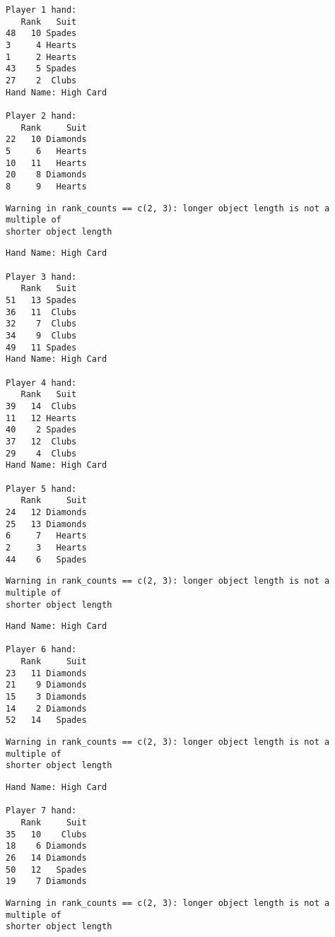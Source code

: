 \documentclass[
  letterpaper,
  DIV=11,
  numbers=noendperiod]{scrartcl}
\begin{document}
\begin{verbatim}
Player 1 hand: 
   Rank   Suit
48   10 Spades
3     4 Hearts
1     2 Hearts
43    5 Spades
27    2  Clubs
Hand Name: High Card 

Player 2 hand: 
   Rank     Suit
22   10 Diamonds
5     6   Hearts
10   11   Hearts
20    8 Diamonds
8     9   Hearts
\end{verbatim}

\begin{verbatim}
Warning in rank_counts == c(2, 3): longer object length is not a multiple of
shorter object length
\end{verbatim}

\begin{verbatim}
Hand Name: High Card 

Player 3 hand: 
   Rank   Suit
51   13 Spades
36   11  Clubs
32    7  Clubs
34    9  Clubs
49   11 Spades
Hand Name: High Card 

Player 4 hand: 
   Rank   Suit
39   14  Clubs
11   12 Hearts
40    2 Spades
37   12  Clubs
29    4  Clubs
Hand Name: High Card 

Player 5 hand: 
   Rank     Suit
24   12 Diamonds
25   13 Diamonds
6     7   Hearts
2     3   Hearts
44    6   Spades
\end{verbatim}

\begin{verbatim}
Warning in rank_counts == c(2, 3): longer object length is not a multiple of
shorter object length
\end{verbatim}

\begin{verbatim}
Hand Name: High Card 

Player 6 hand: 
   Rank     Suit
23   11 Diamonds
21    9 Diamonds
15    3 Diamonds
14    2 Diamonds
52   14   Spades
\end{verbatim}

\begin{verbatim}
Warning in rank_counts == c(2, 3): longer object length is not a multiple of
shorter object length
\end{verbatim}

\begin{verbatim}
Hand Name: High Card 

Player 7 hand: 
   Rank     Suit
35   10    Clubs
18    6 Diamonds
26   14 Diamonds
50   12   Spades
19    7 Diamonds
\end{verbatim}

\begin{verbatim}
Warning in rank_counts == c(2, 3): longer object length is not a multiple of
shorter object length
\end{verbatim}
\end{document}
